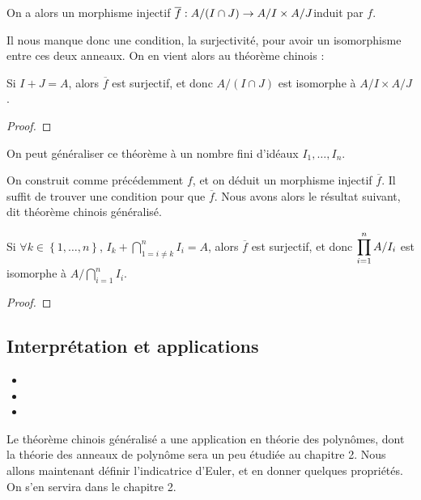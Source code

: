 On a alors un morphisme injectif $\overline{f} : A/(I \cap
J) \rightarrow A/I \times A/J$induit par $f$.

Il nous manque donc une condition, la surjectivité, pour avoir un isomorphisme
entre ces deux anneaux.
On en vient alors au théorème chinois :

\begin{theorem}
	Si $I + J = A$, alors $\overline{f}$ est surjectif, et donc $A/(I \cap
	J)$ est isomorphe à $A/I \times A/J$.
\end{theorem}

\ifdefined\outputproof
\begin{proof}

\end{proof}
\fi

On peut généraliser ce théorème à un nombre fini d'idéaux $I_{1}, \ldots,
I_{n}$.

On construit comme précédemment $f$, et on déduit un morphisme injectif
$\overline{f}$. Il suffit de trouver une condition pour que $\overline{f}$. Nous
avons alors le résultat suivant, dit théorème chinois généralisé.

\begin{theorem}
	Si $\forall k \in \left\{1, \ldots, n\right\}$, $I_{k} + \displaystyle
	\bigcap_{1 = i \ne k}^{n} I_{i} = A$, alors $\overline{f}$ est surjectif, et
	donc $\displaystyle \prod_{i = 1}^{n} A/I_{i}$ est isomorphe à $\displaystyle A/\bigcap_{i = 1}^{n}
	I_{i}$.
\end{theorem}

\ifdefined\outputproof
\begin{proof}

\end{proof}
\fi

\subsection{Interprétation et applications}

\begin{exemple}
	\begin{itemize}
		\item
		\item
		\item
	\end{itemize}
\end{exemple}

Le théorème chinois généralisé a une application en théorie des polynômes, dont
la théorie des anneaux de polynôme sera un peu étudiée au chapitre 2.
Nous allons maintenant définir l'indicatrice d'Euler, et en donner quelques
propriétés.
On s'en servira dans le chapitre 2.

